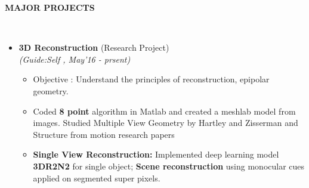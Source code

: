 \documentclass[a4paper,10pt]{article}
\newcommand{\isep}{-2 pt}
\newcommand{\lsep}{-0.5cm}
\newcommand{\resheading}[1]{{\small \colorbox{mygrey}{\begin{minipage}{0.975\textwidth}{\textbf{#1 \vphantom{p\^{E}}}}\end{minipage}}}}
\begin{document}
\resheading{\textbf{MAJOR PROJECTS} }\\[\lsep]
\begin{itemize}
\item \textbf{3D Reconstruction} (Research Project) \\
 \emph{(Guide:Self
, May'16 - prsent)} \\[-0.6cm]
	\begin{itemize}\itemsep \isep
	\item Objective : Understand the principles of reconstruction, epipolar geometry.
	\item Coded \textbf{8 point} algorithm in Matlab and created a meshlab model from images. Studied Multiple View Geometry by Hartley and Zisserman and Structure from motion research papers
	\item \textbf{Single View Reconstruction:} Implemented deep learning model \textbf{3DR2N2} for single object; \textbf{Scene reconstruction} using monocular cues applied on segmented super pixels. 
	\end{itemize}


\end{itemize}
\end{document}
